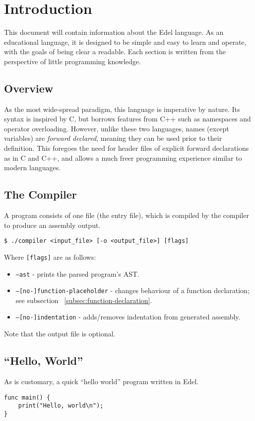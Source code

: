\section{Introduction}\label{sec:introduction}

This document will contain information about the Edel language.
As an educational language, it is designed to be simple and easy to learn and operate, with the goals of being clear a readable.
Each section is written from the perspective of little programming knowledge.

\subsection{Overview}\label{subsec:overview}

As the most wide-spread paradigm, this language is imperative by nature.
Its syntax is inspired by C, but borrows features from C++ such as namespaces and operator overloading.
However, unlike these two languages, names (except variables) are \textit{forward declared}, meaning they can be used prior to their definition.
This foregoes the need for header files of explicit forward declarations as in C and C++, and allows a much freer programming experience similar to modern languages.


\subsection{The Compiler}\label{subsec:the-compiler}

A program consists of one file (the entry file), which is compiled by the compiler to produce an assembly output.

\medskip
\begin{lstlisting}[style=bashconsole]
$ ./compiler <input_file> [-o <output_file>] [flags]
\end{lstlisting}
\medskip

Where \texttt{[flags]} are as follows:
\begin{itemize}
    \item \texttt{--ast} - prints the parsed program's AST.
    \item \texttt{--[no-]function-placeholder} - changes behaviour of a function declaration; see subsection ~\ref{subsec:function-declaration}.
    \item \texttt{--[no-]indentation} - adds/removes indentation from generated assembly.
\end{itemize}
Note that the output file is optional.

\subsection{``Hello, World''}\label{subsec:hello-world}

As is customary, a quick ``hello world'' program written in Edel.

\begin{lstlisting}[language=CustomLang]
func main() {
    print("Hello, world\n");
}
\end{lstlisting}